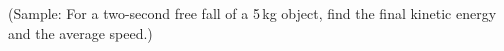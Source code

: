 \documentclass[11pt,pdfa,lastpage]{MishoNote}
\begin{document}
\vspace{3em}

\begin{DownPara}
  (Sample: For a two-second free fall of a 5\,kg object, find the final kinetic energy and the average speed.)\\
\end{DownPara}

\end{document}
